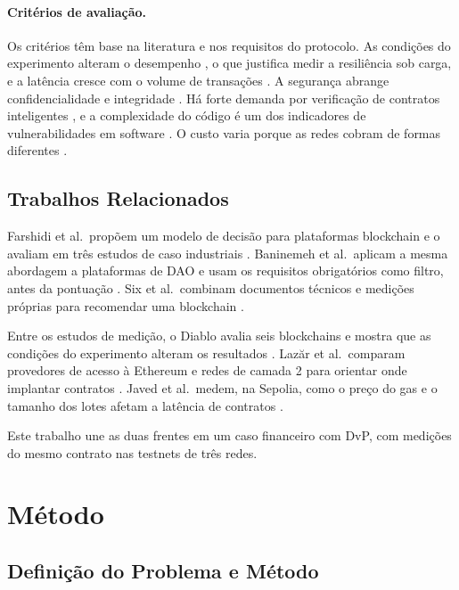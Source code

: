 \documentclass[10pt,a4paper]{article}
\begin{document}
\paragraph{Critérios de avaliação.} Os critérios têm base na literatura e nos requisitos do protocolo. As condições do experimento alteram o desempenho \cite{gramoli2023}, o que justifica medir a resiliência sob carga, e a latência cresce com o volume de transações \cite{javed2025}. A segurança abrange confidencialidade e integridade \cite{iso25010}. Há forte demanda por verificação de contratos inteligentes \cite{tolmach2021}, e a complexidade do código é um dos indicadores de vulnerabilidades em software \cite{shin2011}. O custo varia porque as redes cobram de formas diferentes \cite{ethereum2024gas,monad2024gas}.

\subsection{Trabalhos Relacionados}

Farshidi et al.\ propõem um modelo de decisão para plataformas blockchain e o avaliam em três estudos de caso industriais \cite{farshidi2020}. Baninemeh et al.\ aplicam a mesma abordagem a plataformas de DAO e usam os requisitos obrigatórios como filtro, antes da pontuação \cite{baninemeh2023}. Six et al.\ combinam documentos técnicos e medições próprias para recomendar uma blockchain \cite{six2020}.

Entre os estudos de medição, o Diablo avalia seis blockchains e mostra que as condições do experimento alteram os resultados \cite{gramoli2023}. Lazăr et al.\ comparam provedores de acesso à Ethereum e redes de camada 2 para orientar onde implantar contratos \cite{lazar2025}. Javed et al.\ medem, na Sepolia, como o preço do gas e o tamanho dos lotes afetam a latência de contratos \cite{javed2025}.

Este trabalho une as duas frentes em um caso financeiro com DvP, com medições do mesmo contrato nas testnets de três redes.

\section{Método}\label{sec:metodo}

\subsection{Definição do Problema e Método}
\end{document}
